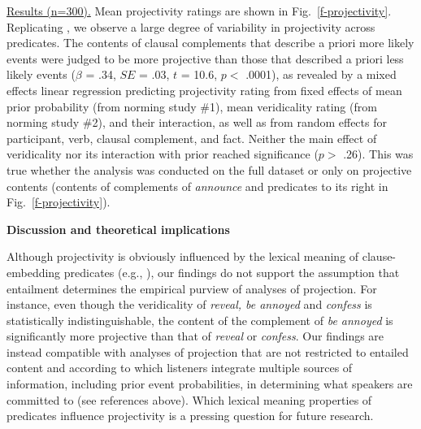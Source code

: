 \documentclass[12pt,fleqn]{article}
\newcommand{\6}{\mbox{$[\hspace*{-.6mm}[$}}
\newcommand{\9}{\mbox{$]\hspace*{-.6mm}]$}}
\begin{document}
\underline{Results (n=300).}  Mean projectivity ratings are shown in Fig.~\ref{f-projectivity}. Replicating \citealt{tbd-variability}, we observe a large degree of variability in projectivity across predicates. The contents of clausal complements that describe a priori more likely events were judged to be more projective than those that described a priori less likely events ($\beta$ = .34, $SE$ = .03, $t$ = 10.6, $p <$ .0001), as revealed by a mixed effects linear regression predicting projectivity rating from fixed effects of mean prior probability (from norming study \#1), mean veridicality rating (from norming study \#2), and their interaction, as well as from random effects for participant, verb, clausal complement, and fact. Neither the main effect of veridicality nor its interaction with prior reached significance ($p >$ .26). This was true whether the analysis was conducted on the full dataset or only on projective contents (contents of complements of {\em announce} and predicates to its right in  Fig.~\ref{f-projectivity}).

{\bf Discussion and theoretical implications}

Although projectivity is obviously influenced by the lexical meaning of clause-embedding predicates (e.g., \citealt{karttunen71b,tbd-variability}), our findings do not support the assumption that entailment determines the empirical purview of analyses of projection. For instance, even though the veridicality of {\em reveal, be annoyed} and {\em confess} is statistically indistinguishable, the content of the complement of {\em be annoyed} is significantly more projective than that of {\em reveal} or {\em confess}. Our findings are instead compatible with analyses of projection that are not restricted to entailed content and according to which listeners integrate multiple sources of information, including prior event probabilities, in determining what speakers are committed to (see references above). Which lexical meaning properties of predicates influence projectivity is a pressing question for future research. 
 
\end{document}

